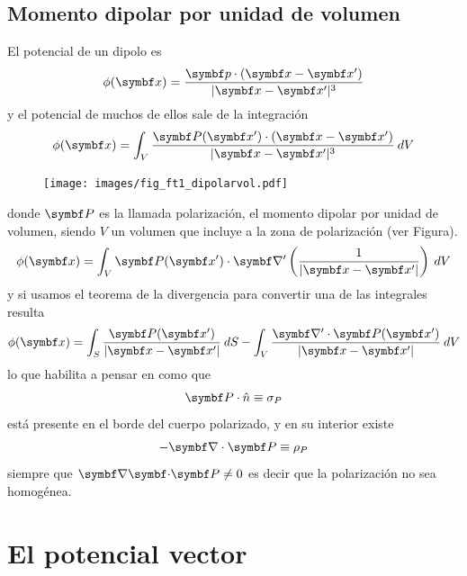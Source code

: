 \documentclass[10pt,oneside]{CBFT_book}
\begin{document}
\subsection{Momento dipolar por unidad de volumen}

El potencial de un dipolo es
\[
	\phi(\vb{x}) = \frac{ \vb{p}\cdot(\vb{x}-\vb{x}') }{|\vb{x} - \vb{x}'|^3} 
\]
y el potencial de muchos de ellos sale de la integración
\[
	\phi(\vb{x}) = \int_V \frac{ \vb{P}(\vb{x}')\cdot(\vb{x}-\vb{x}') }{|\vb{x} - \vb{x}'|^3}  \: dV
\]
\begin{figure}[htb]
	\begin{center}
	\texttt{[image: images/fig\_ft1\_dipolarvol.pdf]}	 
	\end{center}
	\caption{}
\end{figure}
donde $\vb{P}$ es la llamada polarización, el momento dipolar por unidad de volumen, siendo $V$ un volumen
que incluye a la zona de polarización (ver Figura).
\[
	\phi(\vb{x}) = \int_V \vb{P}(\vb{x}')\cdot \Nabla' \left(\frac{1}{|\vb{x} - \vb{x}'|} \right)\: dV
\]
y si usamos el teorema de la divergencia para convertir una de las integrales resulta
\[
	\phi(\vb{x}) = \int_S \frac{\vb{P}(\vb{x}')}{ |\vb{x} - \vb{x}'|} \: dS
	- \int_V  \frac{  \Nabla' \cdot \vb{P}(\vb{x}') }{|\vb{x} - \vb{x}'|} \: dV 
\]
lo que habilita a pensar en como que 
\[
	\vb{P}\cdot\hat{n} \equiv \sigma_P
\]
está presente en el borde del cuerpo polarizado, y en su interior existe
\[
	- \Nabla\cdot\vb{P} \equiv \rho_P
\]
siempre que $\divem{P}\neq 0$ es decir que la polarización no sea homogénea.

\section{El potencial vector}
\end{document}
